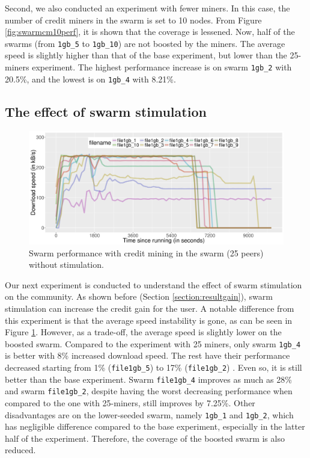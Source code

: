 Second, we also conducted an experiment with fewer miners. In this case, the number of credit miners in the swarm is set to 10 nodes. From Figure \ref{fig:swarmcm10perf}, it is shown that the coverage is lessened. Now, half of the swarms (from \texttt{1gb\_5} to \texttt{1gb\_10}) are not boosted by the miners. The average speed is slightly higher than that of the base experiment, but lower than the 25-miners experiment. The highest performance increase is on swarm \texttt{1gb\_2} with 20.5\%, and the lowest is on \texttt{1gb\_4} with 8.21\%.


\subsection{The effect of swarm stimulation}
\begin{figure}[h!]
	\centering
	\includegraphics[width=\textwidth]{pics/results/swperf_sc1_notrig.png}
	\caption{Swarm performance with credit mining in the swarm (25 peers) without stimulation.}
	\label{fig:swarmcm25perfnotrig}
\end{figure}

Our next experiment is conducted to understand the effect of swarm stimulation on the community. As shown before (Section \ref{section:resultgain}), swarm stimulation can increase the credit gain for the user. A notable difference from this experiment is that the average speed instability is gone, as can be seen in Figure \ref{fig:swarmcm25perfnotrig}. However, as a trade-off, the average speed is slightly lower on the boosted swarm. Compared to the experiment with 25 miners, only swarm \texttt{1gb\_4} is better with 8\% increased download speed. The rest have their performance decreased starting from 1\% (\texttt{file1gb\_5}) to 17\% (\texttt{file1gb\_2}) . Even so, it is still better than the base experiment. Swarm \texttt{file1gb\_4} improves as much as 28\% and swarm \texttt{file1gb\_2}, despite having the worst decreasing performance when compared to the one with 25-miners, still improves by 7.25\%. Other disadvantages are on the lower-seeded swarm, namely \texttt{1gb\_1} and \texttt{1gb\_2}, which has negligible difference compared to the base experiment, especially in the latter half of the experiment. Therefore, the coverage of the boosted swarm is also reduced. 

